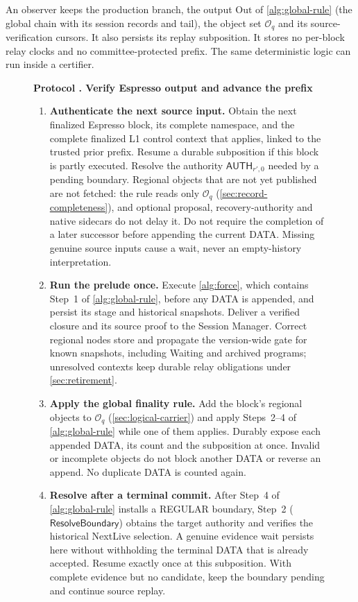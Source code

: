 \documentclass[11pt,a4paper]{article}
\newcommand{\tagg}[1]{\ensuremath{\mathsf{#1}}}
\newcounter{protocol}
\newenvironment{protocol}[3][htbp]{\begin{figure}[#1]\refstepcounter{protocol}\label{#2}
\begin{mdframed}[linewidth=.6pt,skipabove=0pt,skipbelow=0pt,
innertopmargin=7pt,innerbottommargin=7pt]\small
\textbf{Protocol \theprotocol. #3}\par\smallskip}{\end{mdframed}\end{figure}}
\begin{document}
An observer keeps the production branch, the output $\mathrm{Out}$ of
\cref{alg:global-rule} (the global chain with its session records and
tail), the object set $\mathcal O_q$ and its source-verification
cursors. It also persists its replay subposition. It stores no per-block
relay clocks and no committee-protected prefix. The same deterministic
logic can run inside a certifier.

\begin{protocol}{alg:external}{Verify Espresso output and advance the prefix}
\begin{enumerate}[label=\textbf{\arabic*)},itemsep=3pt]
\item \textbf{Authenticate the next source input.} Obtain the next
finalized Espresso block, its complete namespace, and the complete
finalized L1 control context that applies, linked to the trusted prior
prefix. Resume a durable subposition if this block is partly executed.
Resolve the authority $\tagg{AUTH}_{r',0}$ needed by a pending boundary.
Regional objects that are not yet published are not fetched: the rule
reads only $\mathcal O_q$ (\cref{sec:record-completeness}), and optional
proposal, recovery-authority and native sidecars do not delay it. Do not
require the completion of a later successor before appending the
current DATA. Missing genuine source inputs cause a wait, never an
empty-history interpretation.

\item \textbf{Run the prelude once.} Execute \cref{alg:force}, which
contains Step~1 of \cref{alg:global-rule}, before any DATA is appended,
and persist its stage and historical snapshots.
Deliver a verified closure and its source proof to the Session Manager.
Correct regional nodes store and propagate the version-wide gate for
known snapshots, including Waiting and archived programs; unresolved
contexts keep durable relay obligations under \cref{sec:retirement}.

\item \textbf{Apply the global finality rule.} Add the block's regional
objects to $\mathcal O_q$ (\cref{sec:logical-carrier}) and apply
Steps~2--4 of \cref{alg:global-rule} while one of them applies.
Durably expose each appended DATA, its count and the subposition at
once. Invalid or incomplete objects do not block another DATA or
reverse an append. No duplicate DATA is counted again.

\item \textbf{Resolve after a terminal commit.} After Step~4 of
\cref{alg:global-rule} installs a REGULAR boundary, Step~2
($\tagg{ResolveBoundary}$) obtains the target authority and verifies the
historical NextLive selection. A genuine evidence wait persists here
without withholding the terminal DATA that is already accepted. Resume
exactly once at this subposition. With complete evidence but no
candidate, keep the boundary pending and continue source replay.


\end{enumerate}
\end{protocol}
\end{document}
